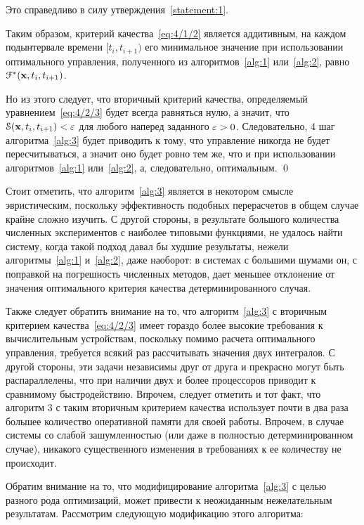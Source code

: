 Это справедливо в силу утверждения~\vref{statement:1}.

Таким образом, критерий качества~\ref{eq:4/1/2} является аддитивным, на каждом подынтервале времени $[t_i, t_{i+1})$ его минимальное значение при использовании оптимального управления, полученного из алгоритмов~\ref{alg:1} или~\ref{alg:2}, равно $\mathcal{F}^{*}(\mathbf{x}, t_i, t_{i+1})$.

Но из этого следует, что вторичный критерий качества, определяемый уравнением~\ref{eq:4/2/3} будет всегда равняться нулю, а значит, что $\mathcal{S}(\mathbf{x}, t_i, t_{i+1}) < \varepsilon$ для любого наперед заданного $\varepsilon > 0$. Следовательно, 4 шаг алгоритма~\ref{alg:3} будет приводить к тому, что управление никогда не будет пересчитываться, а значит оно будет ровно тем же, что и при использовании алгоритмов~\ref{alg:1} или~\ref{alg:2}, а, следовательно, оптимальным. \qed

Стоит отметить, что алгоритм~\ref{alg:3} является в некотором смысле эвристическим, поскольку эффективность подобных перерасчетов в общем случае крайне сложно изучить. С другой стороны, в результате большого количества численных экспериментов с наиболее типовыми функциями, не удалось найти систему, когда такой подход давал бы худшие результаты, нежели алгоритмы~\ref{alg:1} и~\ref{alg:2}, даже наоборот: в системах с большими шумами он, с поправкой на погрешность численных методов, дает меньшее отклонение от значения оптимального критерия качества детерминированного случая.

Также следует обратить внимание на то, что алгоритм~\ref{alg:3} с вторичным критерием качества~\ref{eq:4/2/3} имеет гораздо более высокие требования к вычислительным устройствам, поскольку помимо расчета оптимального управления, требуется всякий раз рассчитывать значения двух интегралов. С другой стороны, эти задачи независимы друг от друга и прекрасно могут быть распараллелены, что при наличии двух и более процессоров приводит к сравнимому быстродействию. Впрочем, следует отметить и тот факт, что алгоритм 3 с таким вторичным критерием качества использует почти в два раза большее количество оперативной памяти для своей работы. Впрочем, в случае системы со слабой зашумленностью (или даже в полностью детерминированном случае), никакого существенного изменения в требованиях к ее количеству не происходит.

\br

Обратим внимание на то, что модифицирование алгоритма~\vref{alg:3} с целью разного рода оптимизаций, может привести к неожиданным нежелательным результатам. Рассмотрим следующую модификацию этого алгоритма:

